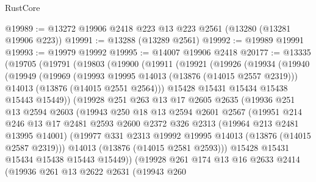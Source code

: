 \begin{lexlean}{RustCore}
\begin{coremodule}
@19989 := @13272 @19906 @2418 @223 @13 @223 @2561 (@13280 (@13281 @19906 @223))
@19991 := @13288 (@13289 @2561)
@19992 := @19989 @19991
@19993 := @19979 @19992
@19995 := @14007 @19906 @2418
@20177 := @13335
    (@19705
      (@19791
        (@19803
          (@19900
            (@19911
              (@19921
                (@19926
                  (@19934
                    (@19940
                      (@19949
                        (@19969
                          (@19993 @19995 @14013 (@13876 (@14015 @2557 @2319)))
                          @14013
                          (@13876 (@14015 @2551 @2564)))
                        @15428
                        @15431
                        @15434
                        @15438
                        @15443
                        @15449))
                    (@19928
                      @251
                      @263
                      @13
                      @17
                      @2605
                      @2635
                      (@19936
                        @251
                        @13
                        @2594
                        @2603
                        (@19943
                          @250
                          @18
                          @13
                          @2594
                          @2601
                          @2567
                          (@19951
                            @214
                            @246
                            @13
                            @17
                            @2481
                            @2593
                            @2600
                            @2372
                            @326
                            @2313
                            (@19964 @213 @2481 @13995 @14001)
                            (@19977 @331 @2313 @19992 @19995 @14013 (@13876 (@14015 @2587 @2319)))
                            @14013
                            (@13876 (@14015 @2581 @2593)))
                          @15428
                          @15431
                          @15434
                          @15438
                          @15443
                          @15449))
                      (@19928
                        @261
                        @174
                        @13
                        @16
                        @2633
                        @2414
                        (@19936
                          @261
                          @13
                          @2622
                          @2631
                          (@19943
                            @260

\end{coremodule}
\end{lexlean}
